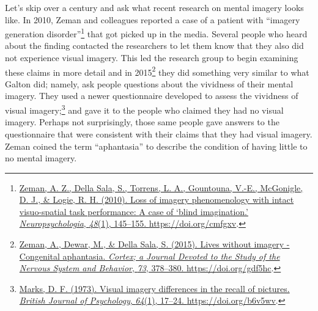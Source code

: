 \documentclass[
  oneside,
  12pt]{crumpbook}
\begin{document}
Let's skip over a century and ask what recent research on mental imagery looks like. In 2010, Zeman and colleagues reported a case of a patient with ``imagery generation disorder''\footnote{\protect\hyperlink{ref-zemanLossImageryPhenomenology2010}{Zeman, A. Z., Della Sala, S., Torrens, L. A., Gountouna, V.-E., McGonigle, D. J., \& Logie, R. H. (2010). Loss of imagery phenomenology with intact visuo-spatial task performance: {A} case of {`blind imagination.'} \emph{Neuropsychologia}, \emph{48}(1), 145--155. \url{https://doi.org/cmfgxv}}.} that got picked up in the media. Several people who heard about the finding contacted the researchers to let them know that they also did not experience visual imagery. This led the research group to begin examining these claims in more detail and in 2015\footnote{\protect\hyperlink{ref-zemanLivesImageryCongenital2015}{Zeman, A., Dewar, M., \& Della Sala, S. (2015). Lives without imagery - {Congenital} aphantasia. \emph{Cortex; a Journal Devoted to the Study of the Nervous System and Behavior}, \emph{73}, 378--380. \url{https://doi.org/gdf5hc}}.} they did something very similar to what Galton did; namely, ask people questions about the vividness of their mental imagery. They used a newer questionnaire developed to assess the vividness of visual imagery;\footnote{\protect\hyperlink{ref-marksVisualImageryDifferences1973}{Marks, D. F. (1973). Visual imagery differences in the recall of pictures. \emph{British Journal of Psychology}, \emph{64}(1), 17--24. \url{https://doi.org/b6v5wv}}.} and gave it to the people who claimed they had no visual imagery. Perhaps not surprisingly, those same people gave answers to the questionnaire that were consistent with their claims that they had visual imagery. Zeman coined the term ``aphantasia'' to describe the condition of having little to no mental imagery.
\end{document}
